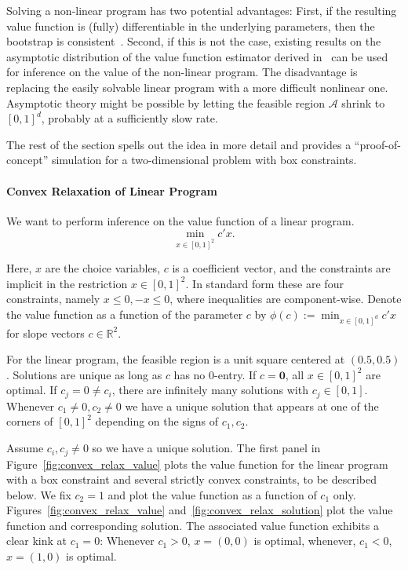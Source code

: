\documentclass[12pt,a4paper,english]{article} %
\numberwithin{equation}{section}
\theoremstyle{definition}
\theoremstyle{remark}
\theoremstyle{plain}
\begin{document}
Solving a non-linear program has two potential advantages:
First, if the resulting value function is (fully) differentiable in the underlying parameters, then the bootstrap is consistent~\citep{fang2019infdirdiff}.
Second, if this is not the case, existing results on the asymptotic distribution of the value function estimator derived in~\cite{shapiro1991asymptotic} can be used for inference on the value of the non-linear program.
The disadvantage is replacing the easily solvable linear program with a more difficult nonlinear one.
Asymptotic theory might be possible by letting the feasible region $\mathcal{A}$ shrink to $[0,1]^d$, probably at a sufficiently slow rate.

The rest of the section spells out the idea in more detail and provides a ``proof-of-concept'' simulation for a two-dimensional problem with box constraints.

\paragraph{Convex Relaxation of Linear Program}
We want to perform inference on the value function of a linear program.
\begin{equation}
	\min_{x\in [0,1]^2} c'x.
\end{equation}

Here, $x$ are the choice variables, $c$ is a coefficient vector, and the constraints are implicit in the restriction $x \in [0,1]^2$.
In standard form these are four constraints, namely $x \leq 0, -x \leq 0$, where inequalities are component-wise.
Denote the value function as a function of the parameter $c$ by $\phi(c) := \min_{x\in[0,1]^d} c'x$ for slope vectors $c\in \mathbb{R}^2$.

For the linear program, the feasible region is a unit square centered at $(0.5, 0.5)$. Solutions are unique as long as $c$ has no $0$-entry.
If $c=\mathbf{0}$, all $x\in [0,1]^2$ are optimal. If $c_j = 0 \neq c_i$, there are infinitely many solutions with $c_j \in [0,1]$.
Whenever $c_1\neq0, c_2\neq0$ we have a unique solution that appears at one of the corners of $[0,1]^2$ depending on the signs of $c_1, c_2$.

Assume $c_i, c_j \neq 0$ so we have a unique solution.
The first panel in Figure~\ref{fig:convex_relax_value} plots the value function for the linear program with a box constraint and several strictly convex constraints, to be described below.
We fix $c_2 = 1$ and plot the value function as a function of $c_1$ only.
Figures~\ref{fig:convex_relax_value} and~\ref{fig:convex_relax_solution} plot the value function and corresponding solution.
The associated value function exhibits a clear kink at $c_1 = 0$: Whenever $c_1 > 0$, $x = (0, 0)$ is optimal, whenever, $c_1 < 0$, $x=(1,0)$ is optimal.
\end{document}
